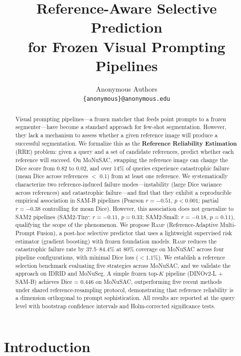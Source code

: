 \documentclass[11pt]{article}
\title{\Large\bf Reference-Aware Selective Prediction\\for Frozen Visual Prompting Pipelines}
\author{Anonymous Authors\\[2pt]
\texttt{\{anonymous\}@anonymous.edu}}
\date{}
\newcommand{\RAMP}{\textsc{Ramp}}
\begin{document}
\maketitle

\begin{abstract}
Visual prompting pipelines---a frozen matcher that feeds point prompts to a
frozen segmenter---have become a standard approach for few-shot segmentation.
However, they lack a mechanism to assess whether a given reference image will
produce a successful segmentation. We formalize this as the \textbf{Reference
Reliability Estimation} (RRE) problem: given a query and a set of candidate
references, predict whether each reference will succeed. On MoNuSAC, swapping
the reference image can change the Dice score from 0.82 to 0.02, and over
14\% of queries experience catastrophic failure (mean Dice across references
$<$ 0.1) from at least one reference. We systematically characterize two
reference-induced failure modes---instability (large Dice variance across
references) and catastrophic failure---and find that they exhibit a
reproducible empirical association in SAM-B pipelines (Pearson $r=-0.51$,
$p<0.001$; partial $r=-0.38$ controlling for mean Dice). However, this
association does not generalize to SAM2 pipelines (SAM2-Tiny: $r=-0.11$,
$p=0.33$; SAM2-Small: $r=-0.18$, $p=0.11$), qualifying the scope of the
phenomenon. We propose \RAMP{} (Reference-Adaptive Multi-Prompt Fusion), a
post-hoc selective predictor that uses a lightweight supervised risk
estimator (gradient boosting) with frozen foundation models. \RAMP{} reduces
the catastrophic failure rate by 37.5--84.4\% at 80\% coverage on MoNuSAC
across four pipeline configurations, with minimal Dice loss ($<1.1\%$). We
establish a reference selection benchmark evaluating five strategies across
MoNuSAC, and we validate the approach on IDRID and MoNuSeg. A simple frozen
top-$K$ pipeline (DINOv2-L + SAM-B) achieves Dice = 0.446 on MoNuSAC,
outperforming five recent methods under shared reference-resampling protocol,
demonstrating that reference reliability is a dimension orthogonal to prompt
sophistication. All results are reported at the query level with bootstrap
confidence intervals and Holm-corrected significance tests.
\end{abstract}

\section{Introduction}
\end{document}
